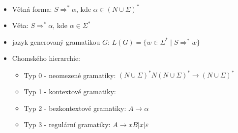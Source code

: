 \documentclass[a4paper, 12pt]{article}
\begin{document}
\begin{itemize}
\item Větná forma: $S \Rightarrow^* \alpha$, kde $\alpha \in  (N \cup \Sigma)^*$
\item Věta: $S \Rightarrow^* \alpha$, kde $\alpha \in  \Sigma^*$
\item jazyk generovaný gramatikou $G$: $L(G) = \lbrace w \in \Sigma^* \;|\; S \Rightarrow^* w \rbrace$
\item Chomského hierarchie:
\begin{itemize}
	\item Typ 0 - neomezené gramatiky: $(N \cup \Sigma)^*N(N \cup \Sigma)^* \rightarrow (N \cup \Sigma)^*$
	\item Typ 1 - kontextové gramatiky:
	\item Typ 2 - bezkontextové gramatiky: $A \rightarrow \alpha$
	\item Typ 3 - regulární gramatiky: $A \rightarrow xB| x|\varepsilon$
\end{itemize}

\end{itemize}
\end{document}
